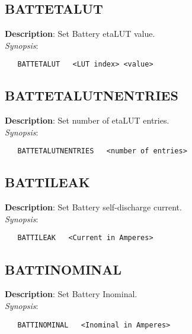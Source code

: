 \subsection{\bf BATTETALUT}
\label{manpages:BATTETALUT}
\label{manpages:battetalut}
\vspace{-0.2in}
{\bf Description}: 	Set Battery etaLUT value.\\[1.5ex]
{\em Synopsis}:
\vspace{-0.2in}
\scriptsize
\begin{verbatim}
   BATTETALUT   <LUT index> <value>				
\end{verbatim}
\normalsize
\vspace{-0.2in}


\subsection{\bf BATTETALUTNENTRIES}
\label{manpages:BATTETALUTNENTRIES}
\label{manpages:battetalutnentries}
\vspace{-0.2in}
{\bf Description}: 	Set number of etaLUT entries.\\[1.5ex]
{\em Synopsis}:
\vspace{-0.2in}
\scriptsize
\begin{verbatim}
   BATTETALUTNENTRIES   <number of entries>			
\end{verbatim}
\normalsize
\vspace{-0.2in}


\subsection{\bf BATTILEAK}
\label{manpages:BATTILEAK}
\label{manpages:battileak}
\vspace{-0.2in}
{\bf Description}: 	Set Battery self-discharge current.\\[1.5ex]
{\em Synopsis}:
\vspace{-0.2in}
\scriptsize
\begin{verbatim}
   BATTILEAK   <Current in Amperes>	
\end{verbatim}
\normalsize
\vspace{-0.2in}


\subsection{\bf BATTINOMINAL}
\label{manpages:BATTINOMINAL}
\label{manpages:battinominal}
\vspace{-0.2in}
{\bf Description}: 	Set Battery Inominal.\\[1.5ex]
{\em Synopsis}:
\vspace{-0.2in}
\scriptsize
\begin{verbatim}
   BATTINOMINAL   <Inominal in Amperes>				
\end{verbatim}
\normalsize
\vspace{-0.2in}


